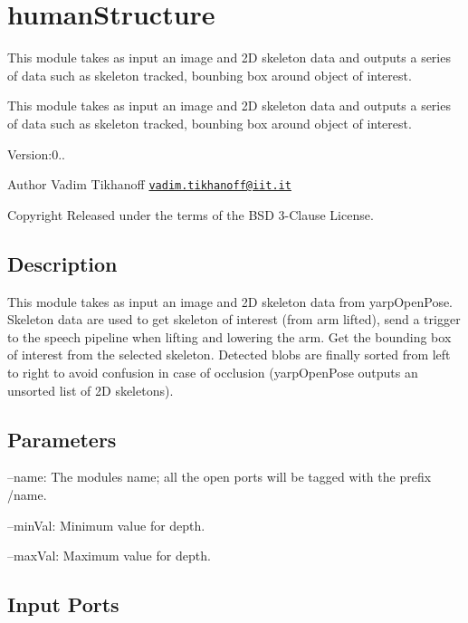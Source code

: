 \section{human\+Structure}
\label{group__humanStructure}


This module takes as input an image and 2D skeleton data and outputs a series of data such as skeleton tracked, bounbing box around object of interest.  


This module takes as input an image and 2D skeleton data and outputs a series of data such as skeleton tracked, bounbing box around object of interest. 

Version\+:0.. \begin{DoxyAuthor}{Author}
Vadim Tikhanoff \href{mailto:vadim.tikhanoff@iit.it}{\tt vadim.\+tikhanoff@iit.\+it} ~\newline
 
\end{DoxyAuthor}
\begin{DoxyCopyright}{Copyright}
Released under the terms of the B\+SD 3-\/\+Clause License. 
\end{DoxyCopyright}
\hypertarget{group__skeletonViewer_intro_sec}{}\subsection{Description}\label{group__skeletonViewer_intro_sec}
This module takes as input an image and 2D skeleton data from yarp\+Open\+Pose. Skeleton data are used to get skeleton of interest (from arm lifted), send a trigger to the speech pipeline when lifting and lowering the arm. Get the bounding box of interest from the selected skeleton. Detected blobs are finally sorted from left to right to avoid confusion in case of occlusion (yarp\+Open\+Pose outputs an unsorted list of 2D skeletons).\hypertarget{group__skeletonViewer_parameters_sec}{}\subsection{Parameters}\label{group__skeletonViewer_parameters_sec}

\begin{DoxyItemize}
\item --name\+: The module\textquotesingle{}s name; all the open ports will be tagged with the prefix /name.
\item --min\+Val\+: Minimum value for depth.
\item --max\+Val\+: Maximum value for depth. 
\end{DoxyItemize}\hypertarget{group__skeletonViewer_inputports_sec}{}\subsection{Input Ports}\label{group__skeletonViewer_inputports_sec}

